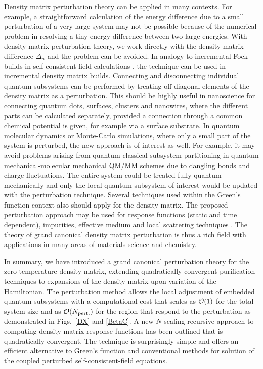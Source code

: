 \documentclass[prl,aps,twocolumn,showpacs,twocolumngrid,superbib]{revtex4}
\begin{document}
Density matrix perturbation theory can be applied in many contexts. 
For example, a straightforward calculation of the energy difference 
due to a small perturbation of a very large system may not be possible because
of the numerical problem in resolving a tiny energy difference between
two large energies. With density matrix perturbation theory, 
we work directly with the density matrix difference $\Delta_n$ and the
problem can be avoided. In analogy to incremental Fock builds
in self-consistent field calculations \cite{Schwengler97}, the technique 
can be used in incremental density matrix builds.
Connecting and disconnecting individual
quantum subsystems can be performed by treating off-diagonal elements of the
density matrix as a perturbation. This should be highly useful in nanoscience 
for connecting quantum dots, surfaces, clusters and nanowires, where the different 
parts can be calculated separately, provided a connection through a common
chemical potential is given, for example via a surface substrate.
In quantum molecular dynamics or Monte-Carlo simulations, where only 
a small part of the system is perturbed, the new approach
is of interest as well. For example, it may avoid problems 
arising from quantum-classical subsystem partitioning in 
quantum mechanical-molecular mechanical QM/MM schemes
due to dangling bonds and charge fluctuations. The entire system 
could be treated fully quantum mechanically and only the local 
quantum subsystem of interest would be updated with the perturbation technique. 
Several techniques used within the Green's function context also should 
apply for the density matrix. The proposed perturbation approach may 
be used for response functions (static and time dependent), impurities, 
effective medium and local scattering techniques \cite{Inglesfield81,Turek,Igor}.  
The theory of grand canonical density matrix perturbation is thus a rich field 
with applications in many areas of materials science and chemistry.

In summary, we have introduced a grand canonical perturbation theory 
for the zero temperature density matrix, extending quadratically convergent 
purification techniques to expansions of the density matrix upon variation
of the Hamiltonian.
The perturbation method allows the local adjustment of 
embedded quantum subsystems with a computational cost that scales as ${\cal O}(1)$
for the total system size and as ${\cal O}(N_{\rm pert.})$ for the 
region that respond to the perturbation as demonstrated in Figs.~\ref{DX} 
and \ref{BetaC}. A new $N$-scaling recursive approach to computing density matrix 
response functions has been outlined that is quadratically convergent.
The technique is surprisingly simple and offers an efficient
alternative to Green's function and conventional methods for solution of 
the coupled perturbed self-consistent-field equations.
\end{document}
